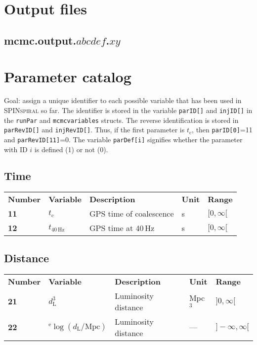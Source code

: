 \documentclass[10pt]{article}
\begin{document}
\pagebreak
\section{Output files}

\subsection{mcmc.output.$abcdef$.$xy$}





\pagebreak
\section{Parameter catalog}
\label{sec:parameter_catalog}
Goal: assign a unique identifier to each possible variable that has been used in \textsc{SPINspiral} so far.
The identifier is stored in the variable \texttt{parID[]} and \texttt{injID[]} in the \texttt{runPar} and 
\texttt{mcmcvariables} structs.  The reverse identification is stored in \texttt{parRevID[]} and 
\texttt{injRevID[]}.  Thus, if the first parameter is $t_\mathrm{c}$, then \texttt{parID[0]}=11 and
\texttt{parRevID[11]}=0.  The variable \texttt{parDef[i]} signifies whether the parameter with ID
$i$ is defined (1) or not (0).

\subsection{Time}
\begin{tabular}{lllll}
  \textbf{Number} & \textbf{Variable} & \textbf{Description} & \textbf{Unit} & \textbf{Range} \\
  \textbf{11} & $t_\mathrm{c}$        & GPS time of coalescence & s & $[0,\infty[$ \\
  \textbf{12} & $t_\mathrm{40\,Hz}$   & GPS time at 40\,Hz & s & $[0,\infty[$ \\
\end{tabular}

\subsection{Distance}
\begin{tabular}{lllll}
  \textbf{Number} & \textbf{Variable} & \textbf{Description} & \textbf{Unit} & \textbf{Range} \\
  \textbf{21} & $d_\mathrm{L}^3$ & Luminosity distance & Mpc$^3$ & $]0,\infty[$ \\
  \textbf{22} & $^\mathrm{e}\log(d_\mathrm{L}/\mathrm{Mpc})$ & Luminosity distance & --- & $]-\infty,\infty[$ \\
\end{tabular}
\end{document}

